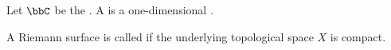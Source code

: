 \begin{definition} \label{definition:riemann_surface}
    Let $\bbC$ be the . A  is a one-dimensional . 

    A Riemann surface is called  if the underlying topological space $X$ is compact.
\end{definition}
